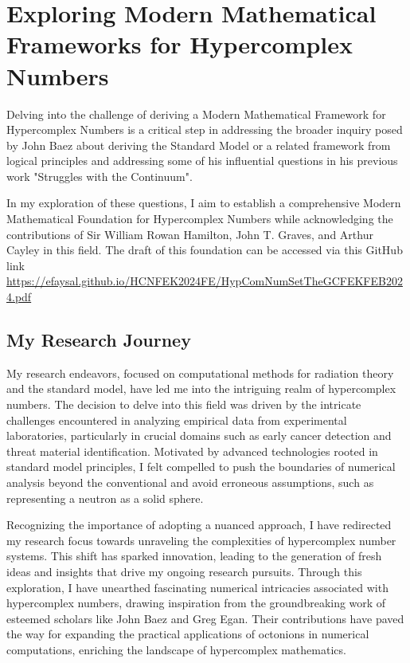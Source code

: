 \documentclass{article}
\begin{document}
\section{Exploring Modern Mathematical Frameworks for Hypercomplex Numbers}

Delving into the challenge of deriving a Modern Mathematical Framework for Hypercomplex Numbers is a critical step in addressing the broader inquiry posed by John Baez about deriving the Standard Model or a related framework from logical principles and addressing some of his influential questions in his previous work "Struggles with the Continuum".

In my exploration of these questions, I aim to establish a comprehensive Modern Mathematical Foundation for Hypercomplex Numbers while acknowledging the contributions of Sir William Rowan Hamilton, John T. Graves, and Arthur Cayley in this field. The draft of this foundation can be accessed via this GitHub link \url{https://efaysal.github.io/HCNFEK2024FE/HypComNumSetTheGCFEKFEB2024.pdf} 

\subsection*{My Research Journey}

My research endeavors, focused on computational methods for radiation theory and the standard model, have led me into the intriguing realm of hypercomplex numbers. The decision to delve into this field was driven by the intricate challenges encountered in analyzing empirical data from experimental laboratories, particularly in crucial domains such as early cancer detection and threat material identification. Motivated by advanced technologies rooted in standard model principles, I felt compelled to push the boundaries of numerical analysis beyond the conventional and avoid erroneous assumptions, such as representing a neutron as a solid sphere.

Recognizing the importance of adopting a nuanced approach, I have redirected my research focus towards unraveling the complexities of hypercomplex number systems. 
This shift has sparked innovation, leading to the generation of fresh ideas and insights that drive my ongoing research pursuits. Through this exploration, I have unearthed fascinating numerical intricacies associated with hypercomplex numbers, drawing inspiration from the groundbreaking work of esteemed scholars like John Baez and Greg Egan. Their contributions have paved the way for expanding the practical applications of octonions in numerical computations, enriching the landscape of hypercomplex mathematics.
\end{document}
